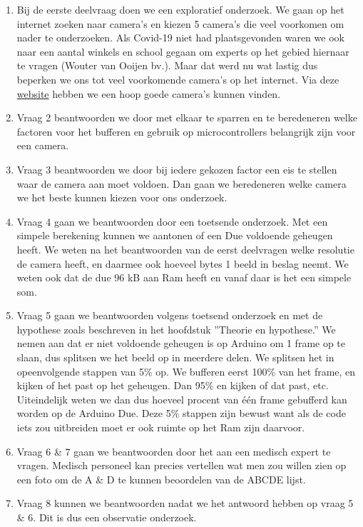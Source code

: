 \documentclass{article}
\begin{document}
\begin{enumerate}
	\item Bij de eerste deelvraag doen we een exploratief onderzoek. We gaan op het internet zoeken naar camera’s en kiezen 5 camera’s die veel voorkomen om nader te onderzoeken. Als Covid-19 niet had plaatsgevonden waren we ook naar een aantal winkels en school gegaan om experts op het gebied hiernaar te vragen (Wouter van Ooijen bv.). Maar dat werd nu wat lastig dus beperken we ons tot veel voorkomende camera’s op het internet. Via deze \href{https://www.open-electronics.org/a-complete-guide-to-arduino-based-video-camera/}{website} hebben we een hoop goede camera’s kunnen vinden.
	\item Vraag 2 beantwoorden we door met elkaar te sparren en te beredeneren welke factoren voor het bufferen en gebruik op microcontrollers belangrijk zijn voor een camera.
	\item Vraag 3 beantwoorden we door bij iedere gekozen factor een eis te stellen waar de camera aan moet voldoen. Dan gaan we beredeneren welke camera we het beste kunnen kiezen voor ons onderzoek.
	\item Vraag 4 gaan we beantwoorden door een toetsende onderzoek. Met een simpele berekening kunnen we aantonen of een Due voldoende geheugen heeft. We weten na het beantwoorden van de eerst deelvragen welke resolutie de camera heeft, en daarmee ook hoeveel bytes 1 beeld in beslag neemt. We weten ook dat de due 96 kB aan Ram heeft en vanaf daar is het een simpele som.
	\item Vraag 5 gaan we beantwoorden volgens toetsend onderzoek en met de hypothese zoals beschreven in het hoofdstuk ”Theorie en hypothese.” We nemen aan dat er niet voldoende geheugen is op Arduino om 1 frame op te slaan, dus splitsen we het beeld op in meerdere delen. We splitsen het in opeenvolgende stappen van 5\% op. We bufferen eerst 100\% van het frame, en kijken of het past op het geheugen. Dan 95\% en kijken of dat past, etc. Uiteindelijk weten we dan dus hoeveel procent van één frame gebufferd kan worden op de Arduino Due. Deze 5\% stappen zijn bewust want als de code iets zou uitbreiden moet er ook ruimte op het Ram zijn daarvoor.
	\item Vraag 6 {\&} 7 gaan we beantwoorden door het aan een medisch expert te vragen. Medisch personeel kan precies vertellen wat men zou willen zien op een foto om de A {\&} D te kunnen beoordelen van de ABCDE lijst.
	\item Vraag 8 kunnen we beantwoorden nadat we het antwoord hebben op vraag 5 {\&} 6. Dit is dus een observatie onderzoek.  

\end{enumerate} 
\end{document}
